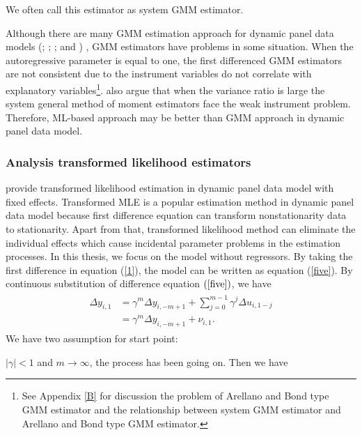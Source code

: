 \documentclass[12pt,a4paper,hyperref]{article}
\begin{document}
We often call this estimator as system GMM estimator.

Although there are many GMM estimation approach for dynamic panel data models (\citet{Arellano:1991}; \citet{Arellano:1995}; \citet{Ahn:1995}; and \citet{Blundell:1998} ) , GMM estimators have problems in some situation.
When the autoregressive parameter is equal to one, the first differenced GMM estimators
are not consistent due to the instrument variables do not correlate with
explanatory variables\footnote{See Appendix \ref{B} for discussion the problem of Arellano and Bond type GMM estimator and the relationship between system GMM estimator and Arellano and Bond type GMM estimator.}.  \citet{Bun:2010} also argue that when the
variance ratio is large the system general method of moment estimators face the weak instrument problem. Therefore, ML-based approach may be better than GMM approach in dynamic panel data model.


\subsubsection{Analysis transformed likelihood estimators }
\citet{Hsiao:2002} provide transformed likelihood estimation in dynamic panel data model with fixed effects. Transformed MLE is a popular estimation method in dynamic panel data model because first difference equation
can transform nonstationarity data to stationarity. Apart from that, transformed likelihood method can eliminate the individual effects which cause incidental parameter problems in the estimation processes. In this thesis, we focus on the model without regressors. By taking the first difference in equation (\ref{1}), the model can be written as equation (\ref{five}).
By continuous substitution of difference equation $\left(\ref{five}\right)$, we have
\begin{align}
\begin{split}
\Delta y_{i,1}&= \gamma^{m} \Delta y_{i ,-m+1} +\sum^{m-1}_{j=0} \gamma^{j} \Delta u_{i , 1-j} \\
&= \gamma^{m} \Delta y_{i ,-m+1}+\nu_{i,1}.
\end{split}
\end{align}
We have two assumption for start point:

$\left\vert \gamma \right\vert < 1$ and $m \rightarrow \infty$, the process has  been going on. Then  we have
\end{document}
